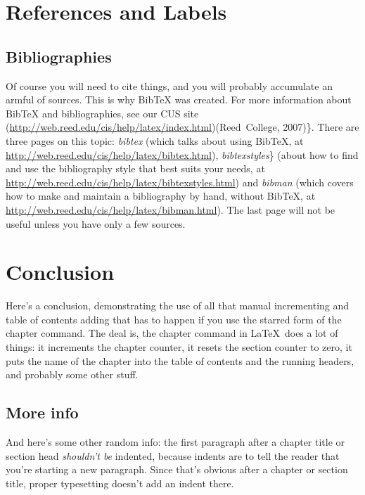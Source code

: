 \documentclass[12pt,twoside]{reedthesis}
\begin{document}
  \chapter{References and Labels}
  
  \section{Bibliographies}\label{bibliographies}
  
  Of course you will need to cite things, and you will probably accumulate
  an armful of sources. This is why BibTeX was created. For more
  information about BibTeX and bibliographies, see our CUS site
  (\url{http://web.reed.edu/cis/help/latex/index.html})(Reed~College,
  2007)\}. There are three pages on this topic: \emph{bibtex} (which talks
  about using BibTeX, at
  \url{http://web.reed.edu/cis/help/latex/bibtex.html}),
  \emph{bibtexstyles}\} (about how to find and use the bibliography style
  that best suits your needs, at
  \url{http://web.reed.edu/cis/help/latex/bibtexstyles.html}) and
  \emph{bibman} (which covers how to make and maintain a bibliography by
  hand, without BibTeX, at
  \url{http://web.reed.edu/cis/help/latex/bibman.html}). The last page
  will not be useful unless you have only a few sources.
  
  \chapter*{Conclusion}
  
  
   
  \setcounter{chapter}{2} \setcounter{section}{0}
  
  Here's a conclusion, demonstrating the use of all that manual
  incrementing and table of contents adding that has to happen if you use
  the starred form of the chapter command. The deal is, the chapter
  command in \LaTeX~does a lot of things: it increments the chapter
  counter, it resets the section counter to zero, it puts the name of the
  chapter into the table of contents and the running headers, and probably
  some other stuff.
  
  \section{More info}
  
  And here's some other random info: the first paragraph after a chapter
  title or section head \emph{shouldn't be} indented, because indents are
  to tell the reader that you're starting a new paragraph. Since that's
  obvious after a chapter or section title, proper typesetting doesn't add
  an indent there.
  
\end{document}
